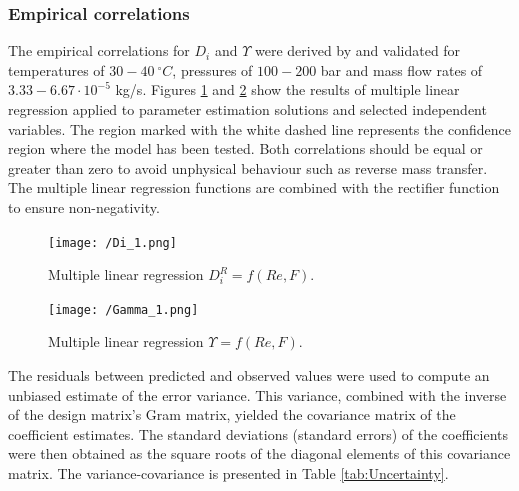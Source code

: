 \documentclass[a4paper,fleqn]{cas-dc}
\begin{document}
		\subsubsection{Empirical correlations}
		
		The empirical correlations for $D_i$ and $\Upsilon$ were derived by \citet{Sliczniuk2024} and validated for temperatures of $30 - 40~^\circ C$, pressures of $100 - 200$ bar and mass flow rates of $3.33-6.67 \cdot 10^{-5}$ kg/s. Figures \ref{fig:Correlation_Di} and \ref{fig:Correlation_Gamma} show the results of multiple linear regression applied to parameter estimation solutions and selected independent variables. The region marked with the white dashed line represents the confidence region where the model has been tested. Both correlations should be equal or greater than zero to avoid unphysical behaviour such as reverse mass transfer. The multiple linear regression functions are combined with the rectifier function to ensure non-negativity.
		
		\begin{figure}[!ht]
			\centering
			\texttt{[image: /Di\_1.png]}
			\caption{Multiple linear regression $D_i^R = f(Re, F)$.}
			\label{fig:Correlation_Di}
		\end{figure}
		
		\begin{figure}[!ht]
			\centering
			\texttt{[image: /Gamma\_1.png]}
			\caption{Multiple linear regression $\Upsilon = f(Re, F)$.}
			\label{fig:Correlation_Gamma}
		\end{figure}
		
		The residuals between predicted and observed values were used to compute an unbiased estimate of the error variance. This variance, combined with the inverse of the design matrix's Gram matrix, yielded the covariance matrix of the coefficient estimates. The standard deviations (standard errors) of the coefficients were then obtained as the square roots of the diagonal elements of this covariance matrix. The variance-covariance is presented in Table \ref{tab:Uncertainty}.
		
\end{document}

